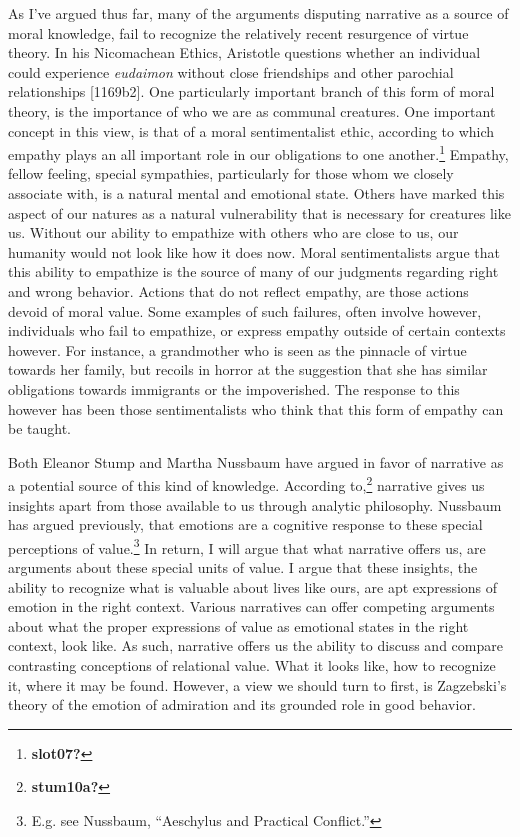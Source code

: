 \documentclass[phdthesis,12pt,final]{wuthesis}
\theoremstyle{definition}
\theoremstyle{definition}
\theoremstyle{definition}
\theoremstyle{definition}
\theoremstyle{remark}
\begin{document}
As I've argued thus far, many of the arguments disputing narrative as a source of moral knowledge, fail to recognize the relatively recent resurgence of virtue theory. In his Nicomachean Ethics, Aristotle questions whether an individual could experience \emph{eudaimon} without close friendships and other parochial relationships {[}1169b2{]}. One particularly important branch of this form of moral theory, is the importance of who we are as communal creatures. One important concept in this view, is that of a moral sentimentalist ethic, according to which empathy plays an all important role in our obligations to one another.\footnote{\textbf{slot07?}} Empathy, fellow feeling, special sympathies, particularly for those whom we closely associate with, is a natural mental and emotional state. Others have marked this aspect of our natures as a natural vulnerability that is necessary for creatures like us. Without our ability to empathize with others who are close to us, our humanity would not look like how it does now. Moral sentimentalists argue that this ability to empathize is the source of many of our judgments regarding right and wrong behavior. Actions that do not reflect empathy, are those actions devoid of moral value. Some examples of such failures, often involve however, individuals who fail to empathize, or express empathy outside of certain contexts however. For instance, a grandmother who is seen as the pinnacle of virtue towards her family, but recoils in horror at the suggestion that she has similar obligations towards immigrants or the impoverished. The response to this however has been those sentimentalists who think that this form of empathy can be taught.

Both Eleanor Stump and Martha Nussbaum have argued in favor of narrative as a potential source of this kind of knowledge. According to,\footnote{\textbf{stum10a?}} narrative gives us insights apart from those available to us through analytic philosophy. Nussbaum has argued previously, that emotions are a cognitive response to these special perceptions of value.\footnote{E.g. see Nussbaum, {``Aeschylus and Practical Conflict.''}} In return, I will argue that what narrative offers us, are arguments about these special units of value. I argue that these insights, the ability to recognize what is valuable about lives like ours, are apt expressions of emotion in the right context. Various narratives can offer competing arguments about what the proper expressions of value as emotional states in the right context, look like. As such, narrative offers us the ability to discuss and compare contrasting conceptions of relational value. What it looks like, how to recognize it, where it may be found. However, a view we should turn to first, is Zagzebski's theory of the emotion of admiration and its grounded role in good behavior.
\end{document}
